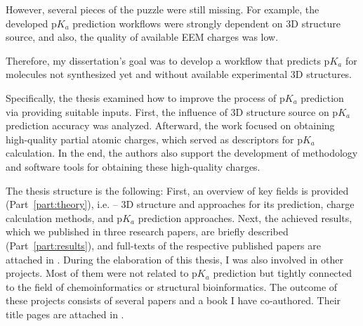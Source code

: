 However, several pieces of the puzzle were still missing. For example, the
developed p$K_a$ prediction workflows \cite{Svobodova2013} were strongly
dependent on 3D structure source, and also, the quality of available EEM charges
was low.

Therefore, my dissertation's goal was to develop a workflow that predicts p$K_a$
for mo\-le\-cu\-les not synthesized yet and without available experimental 3D
structures.

Specifically, the thesis examined how to improve the process of p$K_a$
prediction via providing suitable inputs. First, the influence of 3D structure
source on p$K_a$ prediction accuracy was analyzed. Afterward, the work focused
on obtaining high-quality partial atomic charges, which served as descriptors
for p$K_a$ calculation. In the end, the authors also support the development
of methodology and software tools for obtaining these high-quality charges.

The thesis structure is the following: First, an overview of key fields is
provided (Part~\ref{part:theory}), i.e. -- 3D structure and approaches for its prediction,
charge calculation methods, and p$K_a$ prediction approaches. Next, the
achieved results, which we published in three research papers, are brieﬂy
described (Part~\ref{part:results}), and full-texts of the respective published papers are
attached in . During the elaboration of this thesis, I was also involved
in other projects. Most of them were not related to p$K_a$ prediction but
tightly connected to the ﬁeld of chemoinformatics or structural bioinformatics.
The outcome of these projects consists of several papers and a book I have
co-authored. Their title pages are attached in .



